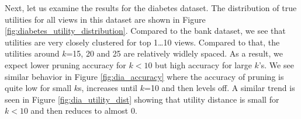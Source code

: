 


 
Next, let us examine the results for the diabetes dataset.
The distribution of true utilities for all views in this dataset are shown in
Figure \ref{fig:diabetes_utility_distribution}.
Compared to the bank dataset, we see that utilities are very closely
clustered for top 1\ldots10 views.
Compared to that, the utilities around $k$=15, 20 and 25 are relatively widlely
spaced.
As a result, we expect lower pruning accuracy for $k<10$ but high accuracy for
large $k$'s.
We see similar behavior in Figure \ref{fig:dia_accuracy} where the accuracy of
pruning is quite low for small $k$s, increases until $k$=10 and then levels off.
A similar trend is seen in Figure \ref{fig:dia_utility_dist} showing that
utility distance is small for $k<10$ and then reduces to almost 0.

